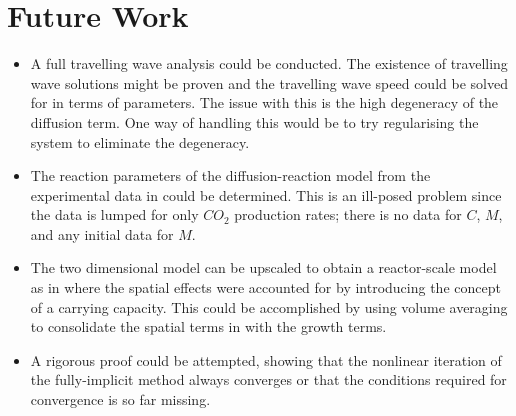 \section{Future Work}


\begin{itemize}

  \item A full travelling wave analysis could be conducted.
    The existence of travelling wave solutions might be proven and the travelling wave speed could be solved for in terms of parameters.
    The issue with this is the high degeneracy of the diffusion term.
    One way of handling this would be to try regularising the system to eliminate the degeneracy.

  \item The reaction parameters of the diffusion-reaction model from the experimental data in \cite{dumitrache2015mathematicalModeling} could be determined.
    This is an ill-posed problem since the data is lumped for only $CO_2$ production rates; there is no data for $C$, $M$, and any initial data for $M$. 

  \item The two dimensional model can be upscaled to obtain a reactor-scale model as in \cite{dumitrache2015mathematicalModeling} where the spatial effects were accounted for by introducing the concept of a carrying capacity.
    This could be accomplished by using volume averaging to consolidate the spatial terms in with the growth terms.

  \item A rigorous proof could be attempted, showing that the nonlinear iteration of the fully-implicit method always converges or that the conditions required for convergence is so far missing.

\end{itemize}
